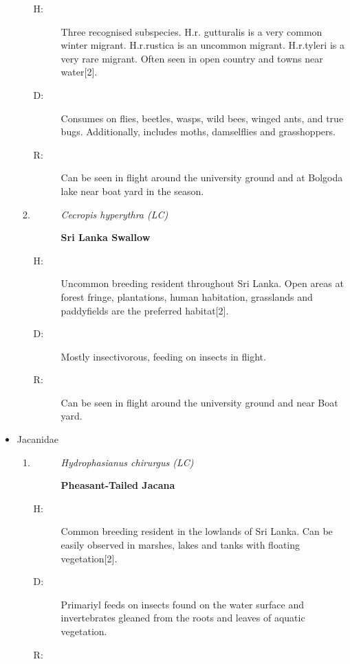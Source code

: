 \begin{itemize}
\begin{enumerate}
\begin{description}%
\item[H: ]%
Three recognised subspecies. H.r. gutturalis is a very common winter migrant. H.r.rustica is an uncommon migrant. H.r.tyleri is a very rare migrant. Often seen in open country and towns near water{[}2{]}.%
\item[D: ]%
Consumes on flies, beetles, wasps, wild bees, winged ants, and true bugs. Additionally, includes moths, damselflies and grasshoppers.%
\item[R: ]%
Can be seen in flight around the university ground and at Bolgoda lake near boat yard in the season.%
\end{description}%
\item%
\begin{description}%
\item[]%
\textit{Cecropis hyperythra (LC)}%
\item[]%
\textbf{Sri Lanka Swallow}%
\end{description}%
\begin{description}%
\item[H: ]%
Uncommon breeding resident throughout Sri Lanka. Open areas at forest fringe, plantations, human habitation, grasslands and paddyfields are the preferred habitat{[}2{]}.%
\item[D: ]%
Mostly insectivorous, feeding on insects in flight.%
\item[R: ]%
Can be seen in flight around the university ground and near Boat yard.%
\end{description}%
\end{enumerate}%
\item%
Jacanidae%
\begin{enumerate}%
\item%
\begin{description}%
\item[]%
\textit{Hydrophasianus chirurgus (LC)}%
\item[]%
\textbf{Pheasant{-}Tailed Jacana}%
\end{description}%
\begin{description}%
\item[H: ]%
Common breeding resident in the lowlands of Sri Lanka. Can be easily observed in marshes, lakes and tanks with floating vegetation{[}2{]}.%
\item[D: ]%
Primariyl feeds on insects found on the water surface and invertebrates gleaned from the roots and leaves of aquatic vegetation.%
\item[R: ]%

\end{description}
\end{enumerate}
\end{itemize}

